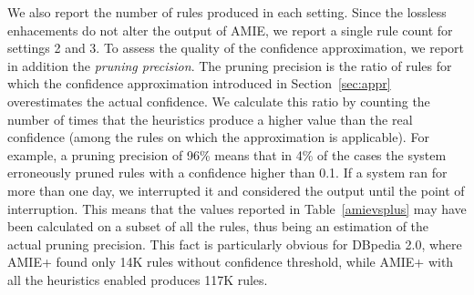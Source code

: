 {We also report the number of rules produced in each setting. 
Since the lossless enhacements do not alter the output of AMIE, we report a single rule count for settings 2 and 3. 
To assess the quality of the confidence approximation, we report in addition the \emph{pruning precision}.
The pruning precision is the ratio of rules for which the confidence approximation introduced
in Section~\ref{sec:appr} overestimates the actual confidence. We
calculate this ratio by counting the number of times that the heuristics
produce a higher value than the real confidence (among the rules on which the approximation is applicable). 
For example, a pruning precision of 96\% means
that in 4\% of the cases the system erroneously pruned rules with a confidence higher than 0.1.
If a system ran for more than one day, we interrupted it
and considered the output until the point of interruption.
This means that the values reported in Table~\ref{amievsplus}
may have been calculated on a
subset of all the rules, thus being an estimation of the actual pruning precision.
This fact is particularly obvious
for DBpedia 2.0, where AMIE+ found only 14K rules without confidence threshold,
while AMIE+ with all the heuristics enabled produces 117K rules.

}
